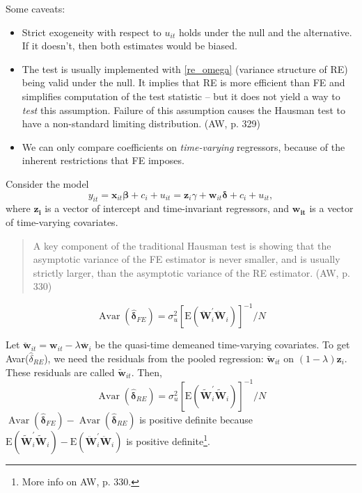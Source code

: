 \documentclass[11pt, a4paper]{report}
\theoremstyle{plain}
\theoremstyle{plain}
\theoremstyle{remark}
\begin{document}
Some caveats: 
\begin{itemize}
    \item Strict exogeneity with respect to $u_{it}$ holds under the null and the alternative. If it doesn't, then both estimates would be biased. 
    \item The test is usually implemented with \ref{re_omega} (variance structure of RE) being valid under the null. It implies that RE is more efficient than FE and simplifies computation of the test statistic -- but it does not yield a way to \textit{test} this assumption. Failure of this assumption causes the Hausman test to have a non-standard limiting distribution. (AW, p. 329)
    \item We can only compare coefficients on \textit{time-varying} regressors, because of the inherent restrictions that FE imposes. 
\end{itemize}

Consider the model
\begin{equation}
    y_{i t}=\mathbf{x}_{i t} \boldsymbol{\beta}+c_{i}+u_{i t}=\mathbf{z}_{i} \gamma+\mathbf{w}_{i t} \boldsymbol{\delta}+c_{i}+u_{i t},
    \end{equation}
where $\mathbf{z_i}$ is a vector of intercept and time-invariant regressors, and $\mathbf{w_{it}}$ is a vector of time-varying covariates.


\begin{quote}
    A key component of the traditional Hausman test is showing that the asymptotic
variance of the FE estimator is never smaller, and is usually strictly larger, than the
asymptotic variance of the RE estimator.  (AW, p. 330)
\end{quote}
\begin{equation}
    \operatorname{Avar}\left(\hat{\boldsymbol{\delta}}_{F E}\right)=\sigma_{u}^{2}\left[\mathrm{E}\left(\ddot{\mathbf{W}}_{i}^{\prime} \ddot{\mathbf{W}}_{i}\right)\right]^{-1} / N
    \end{equation}

Let $\breve{\mathbf{w}}_{i t}=\mathbf{w}_{i t}-\lambda \overline{\mathbf{w}}_{i}$ be the quasi-time demeaned time-varying covariates. To get Avar($\hat{\delta}_{RE}$), we need the residuals from the pooled regression: $\breve{\mathbf{w}}_{i t}$ on $(1-\lambda) \mathbf{z}_{i}$. These residuals are called $\tilde{\mathbf{w}}_{it}$. Then, 
\begin{equation}
    \operatorname{Avar}\left(\hat{\boldsymbol{\delta}}_{R E}\right)=\sigma_{u}^{2}\left[\mathrm{E}\left(\tilde{\mathbf{W}}_{i}^{\prime} \tilde{\mathbf{W}}_{i}\right)\right]^{-1} / N
    \end{equation}
$\operatorname{Avar}\left(\hat{\boldsymbol{\delta}}_{F E}\right) - \operatorname{Avar}\left(\hat{\boldsymbol{\delta}}_{R E}\right)$ is positive definite because $\mathrm{E}\left(\tilde{\mathbf{W}}_{i}^{\prime} \tilde{\mathbf{W}}_{i}\right)-\mathrm{E}\left(\ddot{\mathbf{W}}_{i}^{\prime} \ddot{\mathbf{W}}_{i}\right)$ is positive definite\footnote{More info on AW, p. 330.}.
\end{document}
